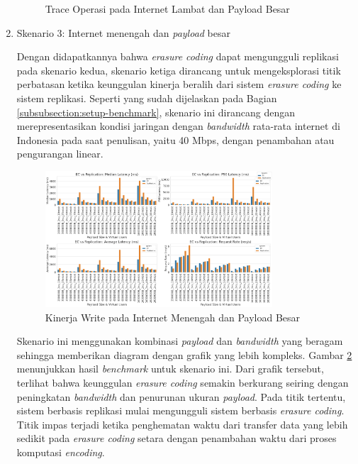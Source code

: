 \begin{enumerate}
\begin{figure}[ht]
		      \caption{Trace Operasi pada Internet Lambat dan Payload Besar}
		      \label{fig:write-bigload-slownet-trace}
	      \end{figure}

	\item Skenario 3: Internet menengah dan \textit{payload} besar

	      Dengan didapatkannya bahwa \textit{erasure coding} dapat mengungguli replikasi pada skenario kedua, skenario ketiga dirancang untuk mengeksplorasi titik perbatasan ketika keunggulan kinerja beralih dari sistem \textit{erasure coding} ke sistem replikasi. Seperti yang sudah dijelaskan pada Bagian \ref{subsubsection:setup-benchmark}, skenario ini dirancang dengan merepresentasikan kondisi jaringan dengan \textit{bandwidth} rata-rata internet di Indonesia pada saat penulisan, yaitu 40 Mbps, dengan penambahan atau pengurangan linear.

	      \begin{figure}[ht]
		      \centering
		      \includegraphics[width=0.8\textwidth]{resources/chapter-4/write_bigload_avgnet.png}

		      \caption{Kinerja Write pada Internet Menengah dan Payload Besar}
		      \label{fig:write-bigload-avgnet}
	      \end{figure}

	      Skenario ini menggunakan kombinasi \textit{payload} dan \textit{bandwidth} yang beragam sehingga memberikan diagram dengan grafik yang lebih kompleks. Gambar \ref{fig:write-bigload-avgnet} menunjukkan hasil \textit{benchmark} untuk skenario ini. Dari grafik tersebut, terlihat bahwa keunggulan \textit{erasure coding} semakin berkurang seiring dengan peningkatan \textit{bandwidth} dan penurunan ukuran \textit{payload}. Pada titik tertentu, sistem berbasis replikasi mulai mengungguli sistem berbasis \textit{erasure coding}. Titik impas terjadi ketika penghematan waktu dari transfer data yang lebih sedikit pada \textit{erasure coding} setara dengan penambahan waktu dari proses komputasi \textit{encoding}.


\end{enumerate}

